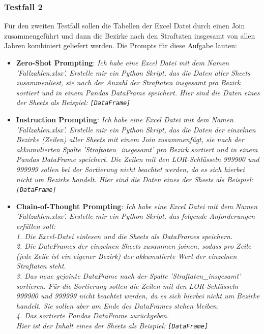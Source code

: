 \documentclass[11pt,a4paper]{article}
\begin{document}
\subsubsection{Testfall 2}
    Für den zweiten Testfall sollen die Tabellen der Excel Datei durch einen Join zusammengeführt und dann die Bezirke nach den Straftaten insgesamt von allen Jahren kombiniert geliefert werden. Die Prompts für diese Aufgabe lauten:
    \begin{itemize}
        \item \textbf{Zero-Shot Prompting}: \emph{Ich habe eine Excel Datei mit dem Namen 'Fallzahlen.xlsx'. Erstelle mir ein Python Skript, das die Daten aller Sheets zusammenliest, sie nach der Anzahl der Straftaten insgesamt pro Bezirk sortiert und in einem Pandas DataFrame speichert. Hier sind die Daten eines der Sheets als Beispiel: \texttt{[DataFrame]}}
        \item \textbf{Instruction Prompting}: \emph{Ich habe eine Excel Datei mit dem Namen 'Fallzahlen.xlsx'. Erstelle mir ein Python Skript, das die Daten der einzelnen Bezirke (Zeilen) aller Sheets mit einem Join zusammenfügt, sie nach der akkumulierten Spalte 'Straftaten\_insgesamt' pro Bezirk sortiert und in einem Pandas DataFrame speichert. Die Zeilen mit den LOR-Schlüsseln 999900 und 999999 sollen bei der Sortierung nicht beachtet werden, da es sich hierbei nicht um Bezirke handelt. Hier sind die Daten eines der Sheets als Beispiel: \texttt{[DataFrame]}}
        \item \textbf{Chain-of-Thought Prompting}: \emph{Ich habe eine Excel Datei mit dem Namen 'Fallzahlen.xlsx'. Erstelle mir ein Python Skript, das folgende Anforderungen erfüllen soll:\\ 1. Die Excel-Datei einlesen und die Sheets als DataFrames speichern.\\ 2. Die DateFrames der einzelnen Sheets zusammen joinen, sodass pro Zeile (jede Zeile ist ein eigener Bezirk) der akkumulierte Wert der einzelnen Straftaten steht.\\ 3. Das neue gejointe DataFrame nach der Spalte 'Straftaten\_insgesamt' sortieren. Für die Sortierung sollen die Zeilen mit den LOR-Schlüsseln 999900 und 999999 nicht beachtet werden, da es sich hierbei nicht um Bezirke handelt. Sie sollen aber am Ende des DataFrames stehen bleiben.\\ 4. Das sortierte Pandas DataFrame zurückgeben.\\ Hier ist der Inhalt eines der Sheets als Beispiel: \texttt{[DataFrame]}}
    \end{itemize}
\end{document}
